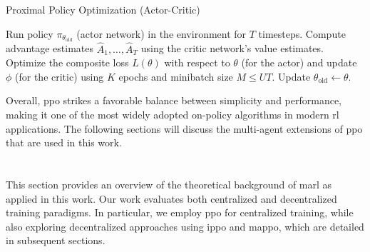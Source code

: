 \begin{algorithm}[H]
\caption{Proximal Policy Optimization (Actor-Critic)}
\label{alg:ppo}
\begin{algorithmic}[1]
        \State Run policy \(\pi_{\theta_{\text{old}}}\) (actor network) in the environment for \(T\) timesteps.
        \State Compute advantage estimates \(\hat{A}_1, \dots, \hat{A}_T\) using the critic network's value estimates.
    \EndFor
    \State Optimize the composite loss \(L(\theta)\) with respect to \(\theta\) (for the actor) and update \(\phi\) (for the critic) using \(K\) epochs and minibatch size \(M \le UT\).
    \State Update \(\theta_{\text{old}} \leftarrow \theta\).
\EndFor
\end{algorithmic}
\end{algorithm}

Overall, \gls{ppo} strikes a favorable balance between simplicity and performance, making it one of the most widely adopted on-policy algorithms in modern \gls{rl} applications. The following sections will discuss the multi-agent extensions of \gls{ppo} that are used in this work.
\section{}
This section provides an overview of the theoretical background of \gls{marl} as applied in this work. Our work evaluates both centralized and decentralized training paradigms. In particular, we employ \gls{ppo} for centralized training, while also exploring decentralized approaches using \gls{ippo} and \gls{mappo}, which are detailed in subsequent sections.
